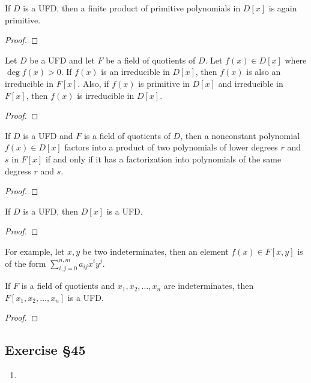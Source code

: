 \begin{corollary}
	If $D$ is a UFD, then a finite product of primitive polynomials in $D[x]$ is again primitive.
\end{corollary}
\begin{proof}
\end{proof}

\begin{lemma}
	Let $D$ be a UFD and let $F$ be a field of quotients of $D$.
	Let $f(x) \in D[x]$ where $\deg f(x) > 0$.
	If $f(x)$ is an irreducible in $D[x]$, then $f(x)$ is also an irreducible in $F[x]$.
	Also, if $f(x)$ is primitive in $D[x]$ and irreducible in $F[x]$, then $f(x)$ is irreducible in $D[x]$.
\end{lemma}
\begin{proof}
\end{proof}

\begin{corollary}
	If $D$ is a UFD and $F$ is a field of quotients of $D$, then a nonconstant polynomial $f(x) \in D[x]$ factors into a product of two polynomials of lower degrees $r$ and $s$ in $F[x]$ if and only if it has a factorization into polynomials of the same degress $r$ and $s$.
\end{corollary}
\begin{proof}
\end{proof}

\begin{theorem}
	If $D$ is a UFD, then $D[x]$ is a UFD.
\end{theorem}
\begin{proof}
\end{proof}

For example, let $x,y$ be two indeterminates, then an element $f(x) \in F[x,y]$ is of the form $\displaystyle\sum_{i,j = 0}^{n,m} a_{ij}x^i y^j$.

\begin{corollary}
	If $F$ is a field of quotients and $x_1,x_2,\dots,x_n$ are indeterminates, then $F[x_1,x_2,\dots,x_n]$ is a UFD.
\end{corollary}
\begin{proof}
\end{proof}

\subsection{Exercise \S45}
\begin{enumerate}
	\item
\end{enumerate}


